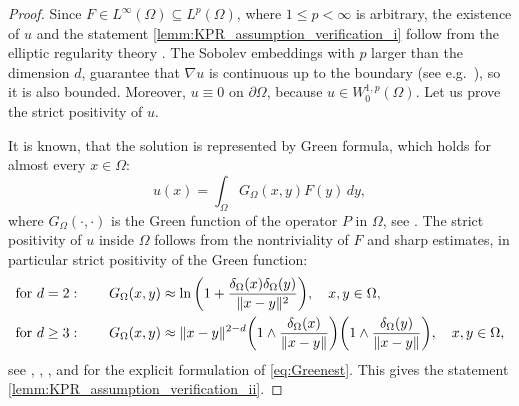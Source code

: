 \documentclass[12pt,a4paper]{amsart}
\theoremstyle{definition}
\begin{document}
\begin{proof}
Since $F\in L^\infty(\Omega)\subseteq L^p(\Omega)$, where $1\le p<\infty$ is arbitrary, the existence of $u$ and the statement \ref{lemm:KPR_assumption_verification_i} follow from the elliptic regularity theory \cite[Theorem~9.15]{MR1814364}.
The Sobolev embeddings with $p$ larger than the dimension $d$, guarantee that $\nabla u$ is continuous up to the boundary (see e.g.~\cite[Exercise 12.59]{Leoni17}), so it is also bounded.
Moreover, $u\equiv 0$ on $\partial\Omega$, because $u\in W^{1,p}_0(\Omega)$.  
Let us prove the strict positivity of $u$.

It is known, that the solution is represented by Green formula, which holds for almost every $x\in\Omega$:
\begin{equation}\label{green0}
 u(x) = \int_\Omega G_\Omega(x,y) F(y)\, dy,
 \end{equation}
where $G_\Omega(\cdot,\cdot)$ is the Green function of the operator $P$ in $\Omega$, see \cite[Theorem~2.3]{MR4554661}.
 The strict positivity of $u$ inside $\Omega$ follows from the nontriviality of $F$ and
  sharp estimates, in particular strict positivity of the Green function:
\begin{align}\label{eq:Greenest2}
&\textnormal{for}\ d=2:\qquad G_\Omega(x,y)\approx \ln \bigg(1 + \frac{\delta_\Omega(x)\delta_\Omega(y)}{\lVert x-y \rVert^2}\bigg),\quad x,y\in \Omega,\\
&\textnormal{for}\ d\geq 3:\qquad 
G_\Omega(x,y)\approx \lVert x-y \rVert^{2-d}\bigg(1\wedge \frac{\delta_\Omega(x)}{\lVert x-y \rVert}\bigg)\bigg(1\wedge \frac{\delta_\Omega(y)}{\lVert x-y \rVert}\bigg),\quad x,y\in \Omega,\label{eq:Greenest}
\end{align}
 see \cite{MR658944}, \cite{MR842803}, \cite{MR1046423}, and \cite[Theorem~1.1]{MR4554661} for the explicit formulation of \eqref{eq:Greenest}.
This gives  the statement \ref{lemm:KPR_assumption_verification_ii}.


\end{proof}
\end{document}
